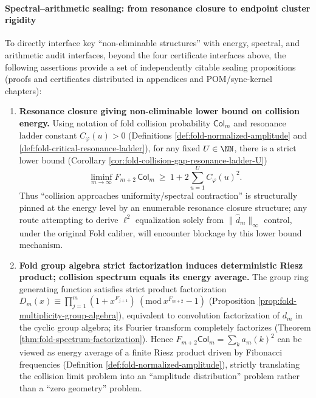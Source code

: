 \paragraph{Spectral--arithmetic sealing: from resonance closure to endpoint cluster rigidity}
To directly interface key ``non-eliminable structures'' with energy, spectral, and arithmetic audit interfaces, beyond the four certificate interfaces above, the following assertions provide a set of independently citable sealing propositions (proofs and certificates distributed in appendices and POM/sync-kernel chapters):
\begin{enumerate}
  \item \textbf{Resonance closure giving non-eliminable lower bound on collision energy.}
  Using notation of fold collision probability \(\mathsf{Col}_m\) and resonance ladder constant \(C_\varphi(u)>0\) (Definitions \ref{def:fold-normalized-amplitude} and \ref{def:fold-critical-resonance-ladder}), for any fixed \(U\in\NN\), there is a strict lower bound (Corollary \ref{cor:fold-collision-gap-resonance-ladder-U})
  \[
  \liminf_{m\to\infty}F_{m+2}\,\mathsf{Col}_m\ \ge\ 1+2\sum_{u=1}^{U}C_\varphi(u)^2.
  \]
  Thus ``collision approaches uniformity/spectral contraction'' is structurally pinned at the energy level by an enumerable resonance closure structure; any route attempting to derive \(\ell^2\) equalization solely from \(\|\widehat d_m\|_\infty\) control, under the original Fold caliber, will encounter blockage by this lower bound mechanism.

  \item \textbf{Fold group algebra strict factorization induces deterministic Riesz product; collision spectrum equals its energy average.}
  The group ring generating function satisfies strict product factorization \(D_m(x)\equiv\prod_{j=1}^m(1+x^{F_{j+1}})\ (\mathrm{mod}\ x^{F_{m+2}}-1)\) (Proposition \ref{prop:fold-multiplicity-group-algebra}), equivalent to convolution factorization of \(d_m\) in the cyclic group algebra; its Fourier transform completely factorizes (Theorem \ref{thm:fold-spectrum-factorization}).
  Hence
  \(
  F_{m+2}\mathsf{Col}_m=\sum_k a_m(k)^2
  \)
  can be viewed as energy average of a finite Riesz product driven by Fibonacci frequencies (Definition \ref{def:fold-normalized-amplitude}), strictly translating the collision limit problem into an ``amplitude distribution'' problem rather than a ``zero geometry'' problem.


\end{enumerate}
